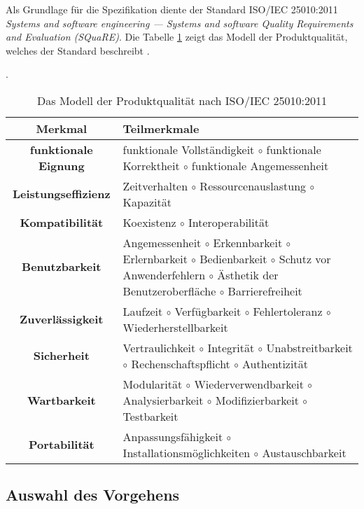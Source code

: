 Als Grundlage für die Spezifikation diente der Standard ISO/IEC 25010:2011 \emph{Systems and software engineering —
Systems and software Quality
Requirements and Evaluation
(SQuaRE)}. Die Tabelle \ref{table:SQuaRE} zeigt das Modell der Produktqualität, welches der Standard beschreibt \autocite[vgl.][S. 10]{ISO25010}. 
\begin{table}[H]
    \centering
    \caption{Das Modell der Produktqualität nach ISO/IEC 25010:2011 \autocite[vgl.][S. 10]{ISO25010}}. 
    \label{table:SQuaRE}
    \begin{tabularx}{\columnwidth}{c|X}
    \textbf{Merkmal} & \textbf{Teilmerkmale} \\
    \hline
    \hline
    \textbf{funktionale Eignung} & 
        funktionale Vollständigkeit {$\circ$} funktionale Korrektheit {$\circ$} funktionale Angemessenheit 
    \\
    \hline
    \textbf{Leistungseffizienz}  & 
        Zeitverhalten {$\circ$} Ressourcenauslastung {$\circ$} Kapazität
    \\
    \hline
    \textbf{Kompatibilität}  & 
        Koexistenz {$\circ$} Interoperabilität
    \\
    \hline
    \textbf{Benutzbarkeit}  & 
        Angemessenheit {$\circ$} Erkennbarkeit {$\circ$} Erlernbarkeit {$\circ$} Bedienbarkeit {$\circ$} Schutz vor Anwenderfehlern {$\circ$} Ästhetik der Benutzeroberfläche {$\circ$} Barrierefreiheit
    \\
    \hline
    \textbf{Zuverlässigkeit}  & 
        Laufzeit {$\circ$} Verfügbarkeit {$\circ$} Fehlertoleranz {$\circ$} Wiederherstellbarkeit
    \\
    \hline
    \textbf{Sicherheit}  & 
        Vertraulichkeit {$\circ$} Integrität {$\circ$} Unabstreitbarkeit {$\circ$} Rechenschaftspflicht {$\circ$} Authentizität 
    \\
    \hline
    \textbf{Wartbarkeit}  & 
        Modularität {$\circ$} Wiederverwendbarkeit {$\circ$} Analysierbarkeit {$\circ$} Modifizierbarkeit {$\circ$} Testbarkeit
    \\
    \hline
    \textbf{Portabilität} & 
        Anpassungsfähigkeit {$\circ$} Installationsmöglichkeiten {$\circ$} \newline Austauschbarkeit
\end{tabularx}
\end{table}

\subsection{Auswahl des Vorgehens}
